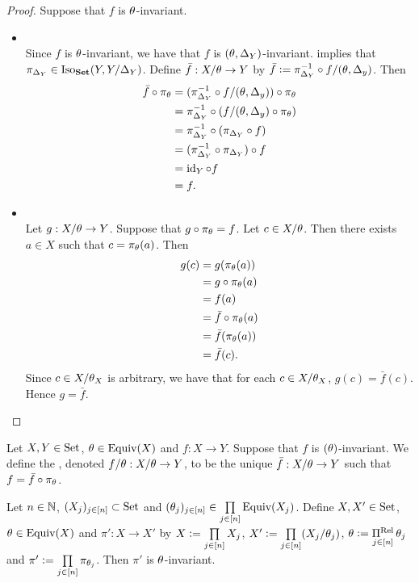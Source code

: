 \begin{proof}
	Suppose that $f$ is $\theta$-invariant. 
	\begin{itemize}
		\item {} \\
		Since $f$ is $\theta$-invariant, we have that $f$ is $(\theta, \Delta_Y)$-invariant.  implies that $\pi_{\Delta_Y} \in \operatorname{Iso}_{\text{\textbf{Set}}}(Y, Y/\Delta_Y)$. Define $\bar{f}: X/\theta \rightarrow Y$ by $\bar{f} \vcentcolon= \pi_{\Delta_Y}^{-1} \circ f/(\theta, \Delta_y)$. Then 
		\begin{align*}
			\bar{f} \circ \pi_{\theta} 
			& = (\pi_{\Delta_Y}^{-1} \circ f/(\theta, \Delta_y)) \circ \pi_{\theta} \\
			& = \pi_{\Delta_Y}^{-1} \circ (f/(\theta, \Delta_y) \circ \pi_{\theta}) \\
			& = \pi_{\Delta_Y}^{-1} \circ (\pi_{\Delta_Y} \circ f) \\
			& = (\pi_{\Delta_Y}^{-1} \circ \pi_{\Delta_Y}) \circ f \\
			& = \operatorname{id}_Y \circ f \\
			& = f. 
		\end{align*} 
		\item {} \\
		Let $g:X/\theta \rightarrow Y$. Suppose that $g \circ \pi_{\theta} = f$. Let $c \in X/\theta$. Then there exists $a \in X$ such that $c = \pi_{\theta}(a)$. Then 
		\begin{align*}
			g(c)
			& = g(\pi_{\theta}(a)) \\
			& = g \circ \pi_{\theta}(a) \\
			& = f(a) \\
			& = \bar{f} \circ \pi_{\theta}(a) \\
			& = \bar{f}(\pi_{\theta}(a)) \\
			& = \bar{f}(c).
		\end{align*}
		Since $c \in X/\theta_X$ is arbitrary, we have that for each $c \in X/\theta_X$, $g(c) = \bar{f}(c)$. Hence $g = \bar{f}$. 
	\end{itemize}
\end{proof}

\begin{defn}
	Let $X, Y \in \text{Set}$, $\theta \in \operatorname*{\text{Equiv}}(X)$ and $f:X \rightarrow Y$. Suppose that $f$ is $(\theta)$-invariant. We define the , denoted $f/\theta:X/\theta \rightarrow Y$, to be the unique $\bar{f}:X/\theta \rightarrow Y$ such that $f = \bar{f} \circ \pi_{\theta}$.
\end{defn}

\begin{ex}
	Let $n \in \mathbb{N}$, $(X_j)_{j \in [n]} \subset \text{Set}$ and $(\theta_j)_{j \in [n]} \in \prod\limits_{j \in [n]} \operatorname*{\text{Equiv}}(X_j)$. Define $X, X' \in \text{Set}$, $\theta \in \operatorname*{\text{Equiv}}(X)$ and $\pi':X \rightarrow X'$ by $X \vcentcolon= \prod\limits_{j \in [n]} X_j$, $X' \vcentcolon= \prod\limits_{j \in [n]} (X_j/\theta_j)$, $\theta \vcentcolon= \operatorname*{\Pi^{\text{Rel}}}\limits_{j \in [n]} \theta_j$ and $\pi' \vcentcolon= \prod\limits_{j \in [n]} \pi_{\theta_j}$. Then $\pi'$ is $\theta$-invariant. 
\end{ex}

